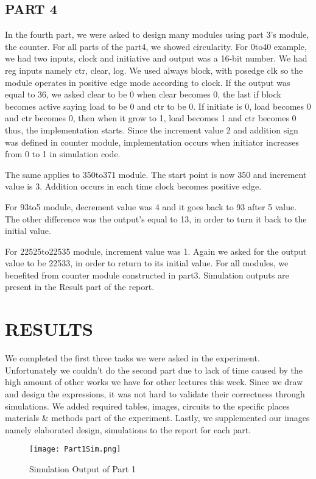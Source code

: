 \documentclass[pdftex,12pt,a4paper]{article}
\begin{document}
\subsection{PART 4}
In the fourth part, we were asked to design many modules using part 3's module, the counter. For all parts of the part4, we showed circularity.
For 0to40 example, we had two inputs, clock and initiative and output was a 16-bit number. We had reg inputs namely ctr, clear, log. We used always block, with posedge clk so the module operates in positive edge mode according to clock. If the output was equal to 36, we asked clear to be 0 when clear becomes 0, the last if block becomes active saying load to be 0 and ctr to be 0. If initiate is 0, load becomes 0 and ctr becomes 0, then when it grow to 1, load becomes 1 and ctr becomes 0 thus, the implementation starts. Since the increment value 2 and addition sign was defined in counter module, implementation occurs when initiator increases from 0 to 1 in simulation code.

The same applies to 350to371 module. The start point is now 350 and increment value is 3. Addition occurs in each time clock becomes positive edge.

For 93to5 module, decrement value was 4 and it goes back to 93 after 5 value. The other difference was the output's equal to 13, in order to turn it back to the initial value.

For 22525to22535 module, increment value was 1. Again we asked for the output value to be 22533, in order to return to its initial value. 
For all modules, we benefited from counter module constructed in part3.
Simulation outputs are present in the Result part of the report.



\newpage
\section{RESULTS }
We completed the first three tasks we were asked in the experiment. Unfortunately we couldn't do the second part due to lack of time caused by the high amount of other works we have for other lectures this week.  Since we draw and design the expressions, it was not hard to validate their correctness through simulations. We added required tables, images, circuits to the specific places materials & methods part of the experiment. Lastly, we supplemented our images namely elaborated design, simulations to the report for each part.

\begin{figure}[ht]
	\centering
	\texttt{[image: Part1Sim.png]}
	\caption{Simulation Output of Part 1}
	\label{fig1}
\end{figure}
\end{document}
